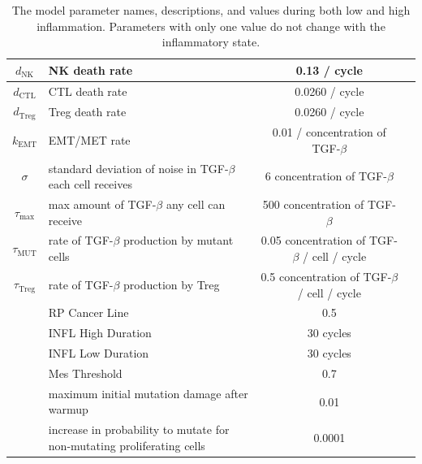 \documentclass[11pt, a4paper, preprint]{article}
\begin{document}
\begin{table}[H]
\begin{center}
\begin{tabular}{|| c | p{7cm} | c | c ||}
  \hline
  $d_\text{NK}$ & NK death rate & 0.13 / cycle &  \\ 
  \hline
  $d_\text{CTL}$ & CTL death rate & 0.0260 / cycle& \\ 
  \hline
  $d_\text{Treg}$ & Treg death rate & 0.0260 / cycle& \\ 
  \hline
  $k_\text{EMT}$ & EMT/MET rate & 0.01 / concentration of TGF-$\beta$ & \\
  \hline
  $\sigma$ & standard deviation of noise in TGF-$\beta$ each cell receives & 6 concentration of TGF-$\beta$ & \\
  \hline
 $\tau_\text{max}$ & max amount of TGF-$\beta$ any cell can receive & 500 concentration of TGF-$\beta$ &\\
  \hline 
 $\tau_\text{MUT}$ & rate of TGF-$\beta$ production by mutant cells & 0.05 concentration of TGF-$\beta$ / cell / cycle& \\
  \hline
 $\tau_\text{Treg}$ & rate of TGF-$\beta$ production by Treg & 0.5 concentration of TGF-$\beta$ / cell / cycle& \\
  \hline
  & RP Cancer Line  & 0.5 &  \\ 
 \hline
&  INFL High Duration & 30 cycles&   \\
 \hline
 & INFL Low Duration &30 cycles&   \\
 \hline
& Mes Threshold & 0.7 &    \\
 \hline
  & maximum initial mutation damage after warmup  & 0.01 &\\
  \hline
  & increase in probability to mutate for non-mutating proliferating cells & 0.0001 & \\
  \hline
\end{tabular}
  \caption{The model parameter names, descriptions, and values during both low and high inflammation. Parameters with only one value do not change with the inflammatory state.}
\end{center}
\end{table}

\newpage
\end{document}
